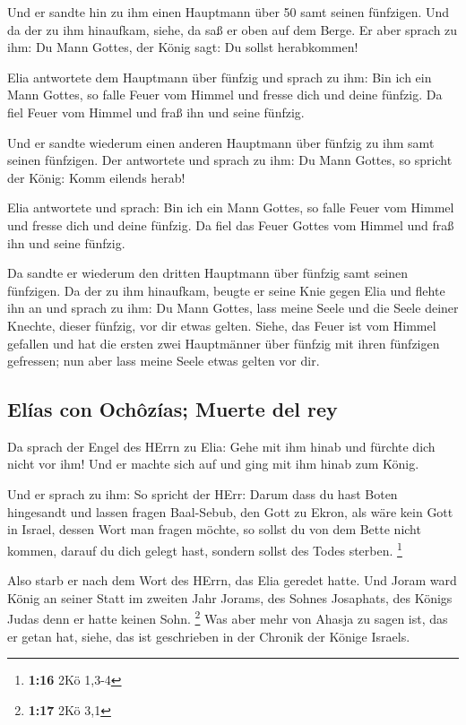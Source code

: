  Und er sandte hin zu ihm einen Hauptmann über 50 samt
seinen fünfzigen. Und da der zu ihm hinaufkam, siehe, da saß er oben auf
dem Berge. Er aber sprach zu ihm: Du Mann Gottes, der König sagt: Du
sollst herabkommen!

 Elia antwortete dem Hauptmann über fünfzig und sprach zu
ihm: Bin ich ein Mann Gottes, so falle Feuer vom Himmel und fresse dich
und deine fünfzig. Da fiel Feuer vom Himmel und fraß ihn und seine
fünfzig.

 Und er sandte wiederum einen anderen Hauptmann über
fünfzig zu ihm samt seinen fünfzigen. Der antwortete und sprach zu ihm:
Du Mann Gottes, so spricht der König: Komm eilends herab!

 Elia antwortete und sprach: Bin ich ein Mann Gottes, so
falle Feuer vom Himmel und fresse dich und deine fünfzig. Da fiel das
Feuer Gottes vom Himmel und fraß ihn und seine fünfzig.

 Da sandte er wiederum den dritten Hauptmann über fünfzig
samt seinen fünfzigen. Da der zu ihm hinaufkam, beugte er seine Knie
gegen Elia und flehte ihn an und sprach zu ihm: Du Mann Gottes, lass
meine Seele und die Seele deiner Knechte, dieser fünfzig, vor dir etwas
gelten.  Siehe, das Feuer ist vom Himmel gefallen und hat
die ersten zwei Hauptmänner über fünfzig mit ihren fünfzigen gefressen;
nun aber lass meine Seele etwas gelten vor dir.

\hypertarget{eluxedas-con-ochuxf4zuxedas-muerte-del-rey}{%
\subsection{Elías con Ochôzías; Muerte del
rey}\label{eluxedas-con-ochuxf4zuxedas-muerte-del-rey}}

 Da sprach der Engel des HErrn zu Elia: Gehe mit ihm
hinab und fürchte dich nicht vor ihm! Und er machte sich auf und ging
mit ihm hinab zum König.

 Und er sprach zu ihm: So spricht der HErr: Darum dass du
hast Boten hingesandt und lassen fragen Baal-Sebub, den Gott zu Ekron,
als wäre kein Gott in Israel, dessen Wort man fragen möchte, so sollst
du von dem Bette nicht kommen, darauf du dich gelegt hast, sondern
sollst des Todes sterben. \footnote{\textbf{1:16} 2Kö 1,3-4}

 Also starb er nach dem Wort des HErrn, das Elia geredet
hatte. Und Joram ward König an seiner Statt im zweiten Jahr Jorams, des
Sohnes Josaphats, des Königs Judas denn er hatte keinen Sohn.
\footnote{\textbf{1:17} 2Kö 3,1}  Was aber mehr von
Ahasja zu sagen ist, das er getan hat, siehe, das ist geschrieben in der
Chronik der Könige Israels.

